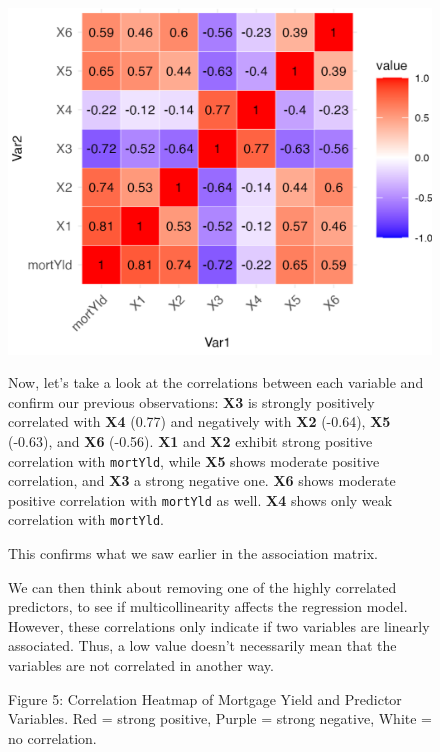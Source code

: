 \documentclass[
  12pt,
]{article}
\begin{document}
\begin{figure}[H]
\centering
\begin{minipage}{0.39\textwidth}
\includegraphics[width=\linewidth]{figures/Figure 5.png}
\captionsetup{font=normalsize}
\caption*{Figure 5: Correlation Heatmap of Mortgage Yield and Predictor Variables. Red = strong positive, Purple = strong negative, White = no correlation.}
\end{minipage}
\hfill
\begin{minipage}{0.59\textwidth}
\vspace{-1cm}
\small
Now, let's take a look at the correlations between each variable and confirm our previous observations:
\textbf{X3} is strongly positively correlated with \textbf{X4} (0.77) and negatively with \textbf{X2} (-0.64), \textbf{X5} (-0.63), and \textbf{X6} (-0.56).
\textbf{X1} and \textbf{X2} exhibit strong positive correlation with \texttt{mortYld}, while \textbf{X5} shows moderate positive correlation, and \textbf{X3} a strong negative one. \textbf{X6} shows moderate positive correlation with \texttt{mortYld} as well. \textbf{X4} shows only weak correlation with \texttt{mortYld}.


This confirms what we saw earlier in the association matrix.

We can then think about removing one of the highly correlated
predictors, to see if multicollinearity affects the regression model.
However, these correlations only indicate if two variables are linearly
associated. Thus, a low value doesn't necessarily mean that the
variables are not correlated in another way.
\end{minipage}


\end{figure}
\end{document}

